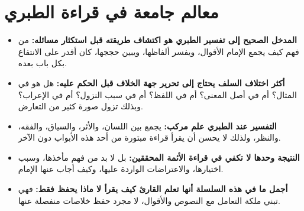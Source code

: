 \section{معالم جامعة في قراءة الطبري}
\begin{itemize}
    \item \textbf{المدخل الصحيح إلى تفسير الطبري هو اكتشاف طريقته قبل استكثار مسائله:} من فهم كيف يجمع الإمام الأقوال، ويفسر ألفاظها، ويبين حججها، كان أقدر على الانتفاع بكل باب بعده.
    \item \textbf{أكثر اختلاف السلف يحتاج إلى تحرير جهة الخلاف قبل الحكم عليه:} هل هو في المثال؟ أم في أصل المعنى؟ أم في اللفظ؟ أم في سبب النزول؟ أم في الإعراب؟ وبذلك تزول صورة كثير من التعارض.
    \item \textbf{التفسير عند الطبري علم مركب:} يجمع بين اللسان، والأثر، والسياق، والفقه، والنظر، ولذلك لا يحسن أن يقرأ قراءة مبتورة من أحد هذه الأبواب دون الآخر.
    \item \textbf{النتيجة وحدها لا تكفي في قراءة الأئمة المحققين:} بل لا بد من فهم مأخذها، وسبب اختيارها، والاعتراضات الواردة عليها، وكيف أجاب عنها الإمام.
    \item \textbf{أجمل ما في هذه السلسلة أنها تعلم القارئ كيف يقرأ لا ماذا يحفظ فقط:} فهي تبني ملكة التعامل مع النصوص والأقوال، لا مجرد حفظ خلاصات منفصلة عنها.
\end{itemize}
